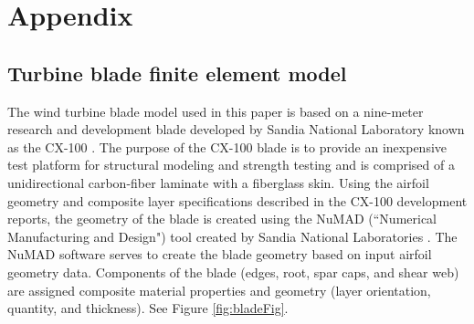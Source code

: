 \documentclass[twocolumn,10pt]{asme2ej}
\begin{document}

%





\pagebreak \pagebreak
\section*{Appendix}
\subsection*{Turbine blade finite element model}
The wind turbine blade model used in this paper is based on a nine-meter research and development blade developed by Sandia National Laboratory known as the CX-100 \cite{Berry08, BerryAshwill07}. The purpose of the CX-100 blade is to provide an inexpensive test platform for structural modeling and strength testing and is comprised of a unidirectional carbon-fiber laminate with a fiberglass skin. Using the airfoil geometry and composite layer specifications described in the CX-100 development reports, the geometry of the blade is created using the NuMAD (``Numerical Manufacturing and Design") tool created by Sandia National Laboratories \cite{BergResor12, ResorPaquette12}. The NuMAD software serves to create the blade geometry based on input airfoil geometry data. Components of the blade (edges, root, spar caps, and shear web) are assigned composite material properties and geometry (layer orientation, quantity, and thickness). See Figure \ref{fig:bladeFig}.
\end{document}
